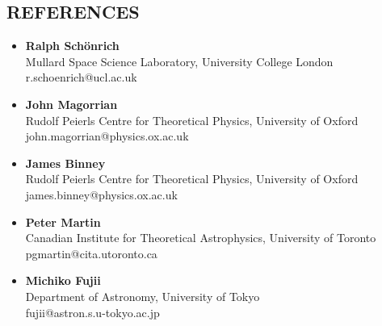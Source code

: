 \documentclass[]{res}
\begin{document}
\begin{resume}
\section{REFERENCES}
\begin{itemize}[leftmargin=*]
    \item \textbf{Ralph Sch\"onrich}\\
    Mullard Space Science Laboratory, University College London\\
    r.schoenrich@ucl.ac.uk
    \item \textbf{John Magorrian}\\
    Rudolf Peierls Centre for Theoretical Physics, University of Oxford\\
    john.magorrian@physics.ox.ac.uk
    \item \textbf{James Binney}\\
    Rudolf Peierls Centre for Theoretical Physics, University of Oxford\\
    james.binney@physics.ox.ac.uk
    \item \textbf{Peter Martin}\\
    Canadian Institute for Theoretical Astrophysics, University of Toronto\\
    pgmartin@cita.utoronto.ca
    \item \textbf{Michiko Fujii}\\
    Department of Astronomy, University of Tokyo\\
    fujii@astron.s.u-tokyo.ac.jp
\end{itemize}


\end{resume}
\end{document}
